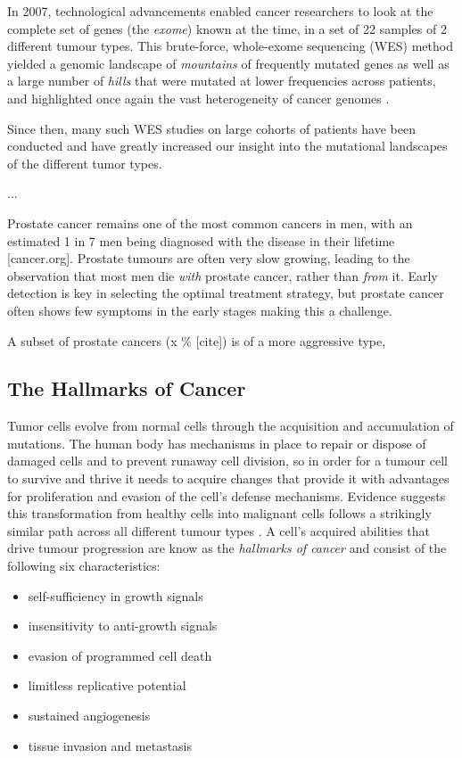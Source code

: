In 2007, technological advancements enabled cancer researchers to look at the complete set of genes (the \textit{exome}) known at the time, in a set of 22 samples of 2 different tumour types. This brute-force, whole-exome sequencing (WES) method yielded a genomic landscape of \textit{mountains} of frequently mutated genes as well as a large number of \textit{hills} that were mutated at lower frequencies across patients, and highlighted once again the vast heterogeneity of cancer genomes \cite{wood2007genomic}.

Since then, many such WES studies on large cohorts of patients have been conducted \cite{wheeler2013human} and have greatly increased our insight into the mutational landscapes of the different tumor types.

...

Prostate cancer remains one of the most common cancers in men, with an estimated 1 in 7 men being diagnosed with the disease in their lifetime \cite{}[cancer.org]. Prostate tumours are often very slow growing, leading to the observation that most men die \emph{with} prostate cancer, rather than \emph{from} it. Early detection is key in selecting the optimal treatment strategy, but prostate cancer often shows few symptoms in the early stages making this a challenge.

A subset of prostate cancers (x \% [cite]) is of a more aggressive type,


\subsection{The Hallmarks of Cancer}

Tumor cells evolve from normal cells through the acquisition and accumulation of mutations. The human body has mechanisms in place to repair or dispose of damaged cells and to prevent runaway cell division, so in order for a tumour cell to survive and thrive it needs to acquire changes that provide it with advantages for proliferation and evasion of the cell's defense mechanisms. Evidence suggests this transformation from healthy cells into malignant cells follows a strikingly similar path across all different tumour types \cite{}. A cell's acquired abilities that drive tumour progression are know as the \emph{hallmarks of cancer} and consist of the following six characteristics:

\begin{itemize}
    \itemsep-0.5em
    \item self-sufficiency in growth signals
    \item insensitivity to anti-growth signals
    \item evasion of programmed cell death
    \item limitless replicative potential
    \item sustained angiogenesis
    \item tissue invasion and metastasis
\end{itemize}

